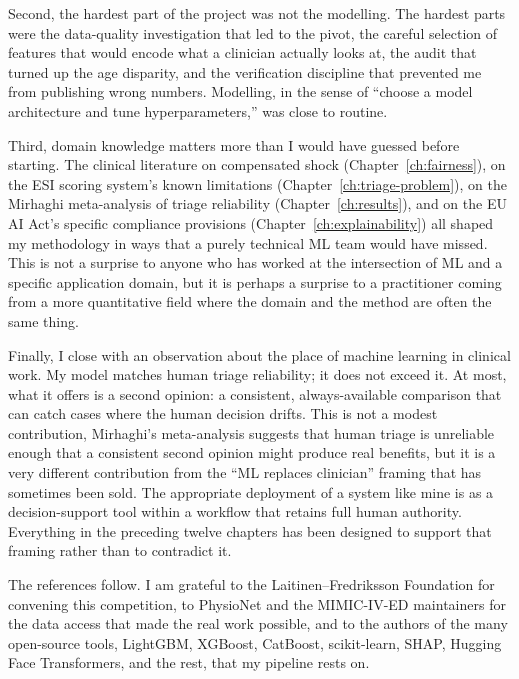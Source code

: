 Second, the hardest part of the project was not the modelling. The hardest parts were the data-quality investigation that led to the pivot, the careful selection of features that would encode what a clinician actually looks at, the audit that turned up the age disparity, and the verification discipline that prevented me from publishing wrong numbers. Modelling, in the sense of ``choose a model architecture and tune hyperparameters,'' was close to routine.

Third, domain knowledge matters more than I would have guessed before starting. The clinical literature on compensated shock (Chapter~\ref{ch:fairness}), on the ESI scoring system's known limitations (Chapter~\ref{ch:triage-problem}), on the Mirhaghi meta-analysis of triage reliability (Chapter~\ref{ch:results}), and on the EU AI Act's specific compliance provisions (Chapter~\ref{ch:explainability}) all shaped my methodology in ways that a purely technical ML team would have missed. This is not a surprise to anyone who has worked at the intersection of ML and a specific application domain, but it is perhaps a surprise to a practitioner coming from a more quantitative field where the domain and the method are often the same thing.

Finally, I close with an observation about the place of machine learning in clinical work. My model matches human triage reliability; it does not exceed it. At most, what it offers is a second opinion: a consistent, always-available comparison that can catch cases where the human decision drifts. This is not a modest contribution, Mirhaghi's meta-analysis suggests that human triage is unreliable enough that a consistent second opinion might produce real benefits, but it is a very different contribution from the ``ML replaces clinician'' framing that has sometimes been sold. The appropriate deployment of a system like mine is as a decision-support tool within a workflow that retains full human authority. Everything in the preceding twelve chapters has been designed to support that framing rather than to contradict it.

The references follow. I am grateful to the Laitinen--Fredriksson Foundation for convening this competition, to PhysioNet and the MIMIC-IV-ED maintainers for the data access that made the real work possible, and to the authors of the many open-source tools, LightGBM, XGBoost, CatBoost, scikit-learn, SHAP, Hugging Face Transformers, and the rest, that my pipeline rests on.
